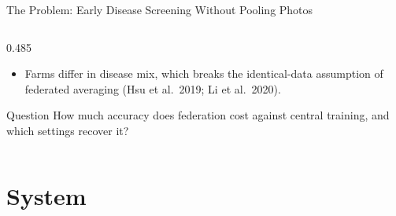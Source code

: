 \documentclass[11pt, aspectratio=169]{beamer}
\begin{document}
\begin{frame}[t]{The Problem: Early Disease Screening Without Pooling Photos}
\begin{columns}[T]
\begin{column}{0.485\textwidth}
\begin{itemize}
        \item Farms differ in disease mix, which breaks the identical-data assumption of federated averaging (Hsu et al.\ 2019; Li et al.\ 2020).
      \end{itemize}\par\vspace{0.4em}
      \begin{block}{Question}
        How much accuracy does federation cost against central training, and which settings recover it?
      \end{block}
    \end{column}
  \end{columns}
\end{frame}

\section{System}
\end{document}
